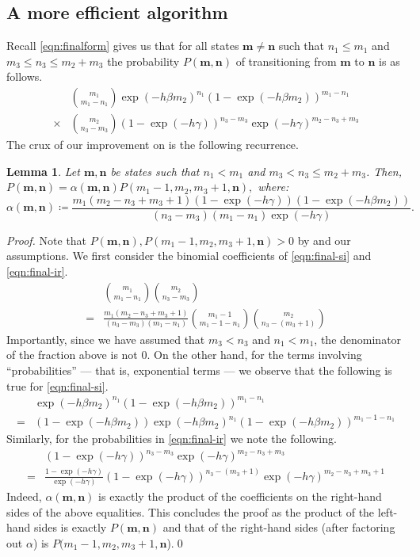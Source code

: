\documentclass[a4paper,preprint]{elsarticle}
\newtheorem{lemma}{Lemma}
\renewcommand{\vec}[1]{\boldsymbol{#1}}
\begin{document}
\subsection{A more efficient algorithm}
Recall \eqref{eqn:finalform} gives us that for all
states $\vec{m} \neq \vec{n}$ such that $n_1 \leq m_1$ and $m_3 \leq n_3 \leq
m_2 + m_3$ the probability $P(\vec{m},\vec{n})$ of transitioning from $\vec{m}$ to $\vec{n}$ is as
follows.
\begin{align}
  & \binom{m_1}{m_1-n_1}\exp(-h\beta m_2)^{n_1}
  (1-\exp(-h\beta m_2))^{m_1-n_1} \label{eqn:final-si}\\
  {}\times{} & \binom{m_2}{n_3-m_3}(1-\exp(-h\gamma))^{n_3-m_3}\exp(-h\gamma)^{m_2-n_3+m_3} \label{eqn:final-ir}
\end{align}
%
The crux of our improvement on  is the following recurrence.
\begin{lemma}\label{lem:recrel}
  Let $\vec{m},\vec{n}$ be states such that $n_1 < m_1$ and $m_3 < n_3 \leq m_2 + m_3$. Then, \(
    P(\vec{m},\vec{n}) = \alpha(\vec{m},\vec{n}) P(m_1-1,m_2,m_3+1,\vec{n}),
  \) where:
  \[
      \alpha(\vec{m},\vec{n}) \coloneqq 
      \frac{m_1(m_2-n_3+m_3+1)(1-\exp(-h\gamma))(1-\exp(-h\beta m_2))}{(n_3-m_3)(m_1-n_1)\exp(-h\gamma)}.
  \]
\end{lemma}
\begin{proof}
  Note that $P(\vec{m},\vec{n}), P(m_1-1,m_2,m_3+1,\vec{n})> 0$ by
   and our assumptions.
  We first consider the binomial coefficients of \eqref{eqn:final-si} and \eqref{eqn:final-ir}.
  \begin{align*}
    & \binom{m_1}{m_1-n_1} \binom{m_2}{n_3-m_3}\\
    {}={} & \frac{m_1(m_2-n_3+m_3+1)}{(n_3-m_3)(m_1-n_1)} \binom{m_1-1}{m_1-1-n_1}
    \binom{m_2}{n_3-(m_3+1)}
  \end{align*}
  Importantly, since we have assumed that $m_3 < n_3$ and $n_1 < m_1$, the denominator of the fraction above is not $0$.
  On the other hand, for the terms involving ``probabilities'' --- that is, exponential terms --- we observe that the following is true for \eqref{eqn:final-si}.
  \begin{align*}
  & \exp(-h\beta m_2)^{n_1}
  (1-\exp(-h\beta m_2))^{m_1-n_1}\\ {}={} &(1-\exp(-h\beta m_2)) \exp(-h\beta m_2)^{n_1}
  (1-\exp(-h\beta m_2))^{m_1-1-n_1}
  \end{align*}
  Similarly, for the probabilities in \eqref{eqn:final-ir} we note the following.
  \begin{align*}
    & (1-\exp(-h\gamma))^{n_3-m_3}\exp(-h\gamma)^{m_2-n_3+m_3}\\
    {}={} & \frac{1-\exp(-h\gamma)}{\exp(-h\gamma)} (1-\exp(-h\gamma))^{n_3-(m_3+1)}\exp(-h\gamma)^{m_2-n_3+m_3+1}
  \end{align*}
  Indeed, $\alpha(\vec{m},\vec{n})$ is exactly the product of the coefficients on the right-hand sides of the above equalities. This concludes the proof as the product of the left-hand sides is exactly $P(\vec{m},\vec{n})$ and that of the right-hand sides (after factoring out $\alpha$) is $P(m_1-1,m_2,m_3+1,\vec{n}$).\qed
\end{proof}
\end{document}
